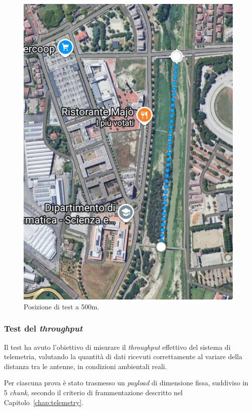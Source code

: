 \documentclass[12pt,a4paper,twoside]{book}
\begin{document}
\begin{figure}[H]
\begin{minipage}{0.32\textwidth}
        \includegraphics[width=\textwidth]{img/tests/T1/sat/500-full.jpeg}
        \caption{Posizione di test a 500m.}
        \label{fig:throughput-test-500m}
    \end{minipage}
\end{figure}

\subsubsection{Test del \emph{throughput}}

Il test ha avuto l’obiettivo di misurare il \emph{throughput} effettivo del
sistema di telemetria, valutando la quantità di dati ricevuti correttamente al
variare della distanza tra le antenne, in condizioni ambientali reali.

Per ciascuna prova è stato trasmesso un \emph{payload} di dimensione fissa,
suddiviso in 5 \emph{chunk}, secondo il criterio di frammentazione descritto nel
Capitolo~\ref{chap:telemetry}.
\end{document}
